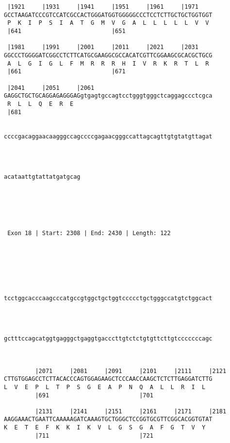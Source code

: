 \documentclass{article}
\begin{document}
\begin{Verbatim}
 |1921     |1931     |1941     |1951     |1961     |1971    
GCCTAAGATCCCGTCCATCGCCACTGGGATGGTGGGGGCCCTCCTCTTGCTGCTGGTGGT
 P  K  I  P  S  I  A  T  G  M  V  G  A  L  L  L  L  L  V  V 
 |641                          |651                         
   
 |1981     |1991     |2001     |2011     |2021     |2031    
GGCCCTGGGGATCGGCCTCTTCATGCGAAGGCGCCACATCGTTCGGAAGCGCACGCTGCG
 A  L  G  I  G  L  F  M  R  R  R  H  I  V  R  K  R  T  L  R 
 |661                          |671                         
   
 |2041     |2051     |2061                                  
GAGGCTGCTGCAGGAGAGGGAGgtgagtgccagtcctgggtgggctcaggagccctcgca
 R  L  L  Q  E  R  E                                        
 |681                                                       
   
                                                            
ccccgacaggaacaagggccagccccgagaacgggccattagcagttgtgtatgttagat
                                                            
                                                            
   
                      
acataattgtattatgatgcag
                      
                      
  



 Exon 18 | Start: 2308 | End: 2430 | Length: 122 





   
                                                            
tcctggcacccaagcccatgccgtggctgctggtccccctgctgggccatgtctggcact
                                                            
                                                            
   
                                                            
gctttccagcatggtgagggctgaggtgacccttgtctctgtgttcttgtcccccccagc
                                                            
                                                            
   
         |2071     |2081     |2091     |2101     |2111     |2121
CTTGTGGAGCCTCTTACACCCAGTGGAGAAGCTCCCAACCAAGCTCTCTTGAGGATCTTG
L  V  E  P  L  T  P  S  G  E  A  P  N  Q  A  L  L  R  I  L  
         |691                          |701                 
   
         |2131     |2141     |2151     |2161     |2171     |2181
AAGGAAACTGAATTCAAAAAGATCAAAGTGCTGGGCTCCGGTGCGTTCGGCACGGTGTAT
K  E  T  E  F  K  K  I  K  V  L  G  S  G  A  F  G  T  V  Y  
         |711                          |721                 
   

\end{Verbatim}
\end{document}
